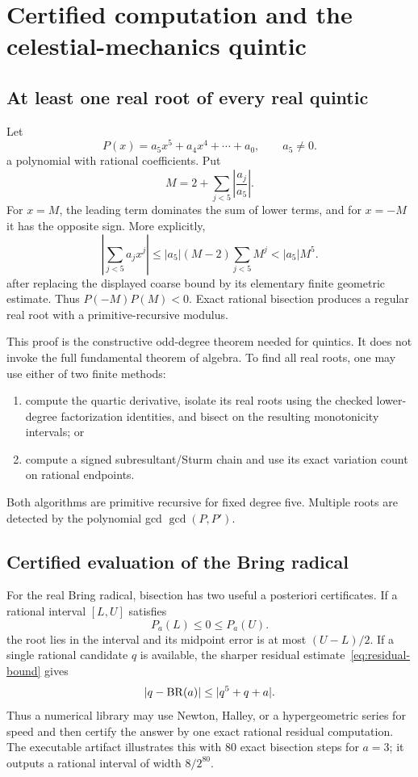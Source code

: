 \section{Certified computation and the celestial-mechanics quintic}\label{sec:applications}

\subsection{At least one real root of every real quintic}

Let
\[
 P(x)=a_5x^5+a_4x^4+\cdots+a_0,
 \qquad a_5\ne0.
\]
a polynomial with rational coefficients.  Put
\[
 M=2+\sum_{j<5}\left|\frac{a_j}{a_5}\right|.
\]
For \(x=M\), the leading term dominates the sum of lower terms, and for
\(x=-M\) it has the opposite sign.  More explicitly,
\[
 \left|\sum_{j<5}a_jx^j\right|
 \le |a_5|(M-2)\sum_{j<5}M^j
 <|a_5|M^5.
\]
after replacing the displayed coarse bound by its elementary finite geometric
estimate.  Thus \(P(-M)P(M)<0\).  Exact rational bisection produces a regular
real root with a primitive-recursive modulus.

This proof is the constructive odd-degree theorem needed for quintics.  It does
not invoke the full fundamental theorem of algebra.  To find all real roots,
one may use either of two finite methods:

\begin{enumerate}
\item compute the quartic derivative, isolate its real roots using the checked
      lower-degree factorization identities, and bisect on the resulting
      monotonicity intervals; or
\item compute a signed subresultant/Sturm chain and use its exact variation
      count on rational endpoints.
\end{enumerate}

Both algorithms are primitive recursive for fixed degree five.  Multiple roots
are detected by the polynomial gcd \(\gcd(P,P')\).

\subsection{Certified evaluation of the Bring radical}

For the real Bring radical, bisection has two useful a posteriori certificates.
If a rational interval \([L,U]\) satisfies
\[
 P_a(L)\le0\le P_a(U).
\]
the root lies in the interval and its midpoint error is at most
\((U-L)/2\).  If a single rational candidate \(q\) is available, the sharper
residual estimate~\eqref{eq:residual-bound} gives
\[
 |q-\operatorname{BR}(a)|\le|q^5+q+a|.
\]
Thus a numerical library may use Newton, Halley, or a hypergeometric series for
speed and then certify the answer by one exact rational residual computation.
The executable artifact illustrates this with 80 exact bisection steps for
\(a=3\); it outputs a rational interval of width \(8/2^{80}\).

